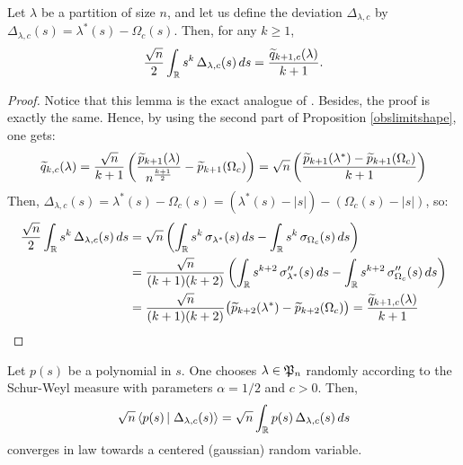\documentclass[10pt]{amsart}
\begin{document}
\begin{lemma}\label{moment}
Let $\lambda$ be a partition of size $n$, and let us define the deviation $\Delta_{\lambda,c}$ by 
$\Delta_{\lambda,c}(s)=\lambda^{*}(s)-\Omega_{c}(s)$. Then, for any $k\geq 1$,
$$\frac{\sqrt{n}}{2}\int_{\mathbb{R}}s^{k}\,\Delta_{\lambda,c}(s)\,ds=\frac{\widetilde{q}_{k+1,c}(\lambda)}{k+1}.$$
\end{lemma}
\medskip

\begin{proof}
Notice that this lemma is the exact analogue of \cite[Proposition 7.2]{IO02}. Besides, the proof is exactly the same. Hence, by using the second part of Proposition \ref{obslimitshape}, one gets:
$$\widetilde{q}_{k,c}(\lambda)=\frac{\sqrt{n}}{k+1}\left(\frac{\widetilde{p}_{k+1}(\lambda)}{n^{\frac{k+1}{2}}}-\widetilde{p}_{k+1}(\Omega_{c})\right)=\sqrt{n}\left(\frac{{\widetilde{p}_{k+1}(\lambda^{*})}-\widetilde{p}_{k+1}(\Omega_{c})}{k+1}\right)$$
Then, $\Delta_{\lambda,c}(s)=\lambda^{*}(s)-\Omega_{c}(s)=(\lambda^{*}(s)-|s|)-(\Omega_{c}(s)-|s|)$, so:
\begin{align*}
\frac{\sqrt{n}}{2}\int_{\mathbb{R}}s^{k}\,\Delta_{\lambda,c}(s)\,ds&=\sqrt{n} \left(\int_{\mathbb{R}}s^{k}\,\sigma_{\lambda^{*}}(s)\,ds-\int_{\mathbb{R}}s^{k}\,\sigma_{\Omega_{c}}(s)\,ds\right)\\
&=\frac{\sqrt{n}}{(k+1)(k+2)}\left(\int_{\mathbb{R}}s^{k+2}\,\sigma_{\lambda^{*}}''(s)\,ds-\int_{\mathbb{R}}s^{k+2}\,\sigma_{\Omega_{c}}''(s)\,ds\right)\\
&=\frac{\sqrt{n}}{(k+1)(k+2)}\big(\widetilde{p}_{k+2}(\lambda^{*})-\widetilde{p}_{k+2}(\Omega_{c})\big)=\frac{\widetilde{q}_{k+1,c}(\lambda)}{k+1}
\end{align*}
\end{proof}\bigskip

\begin{proposition}\label{linearfunctional}
Let $p(s)$ be a polynomial in $s$. One chooses $\lambda\in \mathfrak{P}_{n}$ randomly according to the Schur-Weyl measure with parameters $\alpha=1/2$ and $c>0$. Then, 
$$\sqrt{n}\scal{p(s)}{\Delta_{\lambda,c}(s)}=\sqrt{n}\int_{\R}p(s)\,\Delta_{\lambda,c}(s)\,ds$$ converges in law towards a centered (gaussian) random variable.
\end{proposition}
\end{document}
